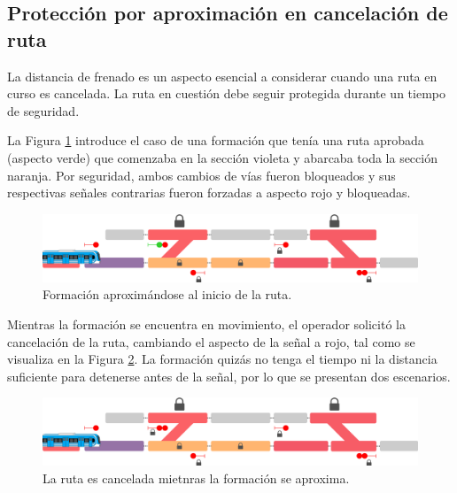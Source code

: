 \subsection{Protección por aproximación en cancelación de ruta}

	\label{sec:function_3}
	
	La distancia de frenado es un aspecto esencial a considerar cuando una ruta en curso es cancelada. La ruta en cuestión debe seguir protegida durante un tiempo de seguridad.
	
	La Figura \ref{fig:ACG_aproximacion_1} introduce el caso de una formación que tenía una ruta aprobada (aspecto verde) que comenzaba en la sección violeta y abarcaba toda la sección naranja. Por seguridad, ambos cambios de vías fueron bloqueados y sus respectivas señales contrarias fueron forzadas a aspecto rojo y bloqueadas.

    \begin{figure}[!h]
        \centering
        \includegraphics[width=1\textwidth]{Figuras/aproximacion_1}
        \centering\caption{Formación aproximándose al inicio de la ruta.}
        \label{fig:ACG_aproximacion_1}
    \end{figure}
    
    Mientras la formación se encuentra en movimiento, el operador solicitó la cancelación de la ruta, cambiando el aspecto de la señal a rojo, tal como se visualiza en la Figura \ref{fig:ACG_aproximacion_2}. La formación quizás no tenga el tiempo ni la distancia suficiente para detenerse antes de la señal, por lo que se presentan dos escenarios. 
    
    \begin{figure}[!h]
        \centering
        \includegraphics[width=1\textwidth]{Figuras/aproximacion_2}
        \centering\caption{La ruta es cancelada mietnras la formación se aproxima.}
        \label{fig:ACG_aproximacion_2}
    \end{figure}
    
